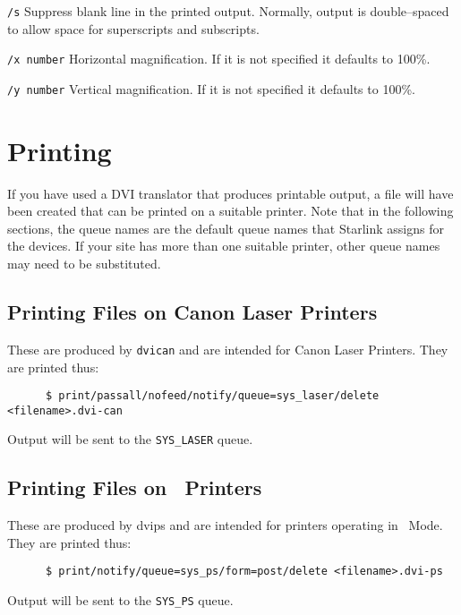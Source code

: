 \begin{list}
\item[\tt /s] Suppress blank line in the printed output. Normally, output is
double--spaced to allow space for superscripts and subscripts.

\item[\tt /x number] Horizontal magnification. If it
is not specified it defaults to 100\%.                                   

\item[\tt /y number] Vertical magnification. If it
is not specified it defaults to 100\%.                                   

\end{list}

\section{Printing}
\label{se:printing}

If you have used a DVI translator that produces printable output, a file will
have been created that can be printed on a suitable printer. Note that in the
following sections, the queue names are the default queue names that Starlink
assigns for the devices. If your site has more than one suitable printer,
other queue names may need to be substituted.

\subsection{Printing Files on Canon Laser Printers}

These are produced by \verb+dvican+ and are intended for Canon Laser Printers. 
They are printed thus:
\begin{verbatim}
      $ print/passall/nofeed/notify/queue=sys_laser/delete <filename>.dvi-can
\end{verbatim}
Output will be sent to the \mbox{\tt SYS\_LASER} queue.                  
                            

\subsection{Printing Files on \PS\ Printers}

These are produced by dvips and are intended for printers operating 
in \PS\ Mode. They are printed thus:
\begin{verbatim}
      $ print/notify/queue=sys_ps/form=post/delete <filename>.dvi-ps
\end{verbatim}
Output will be sent to the \mbox{\tt SYS\_PS} queue.   
                                                



